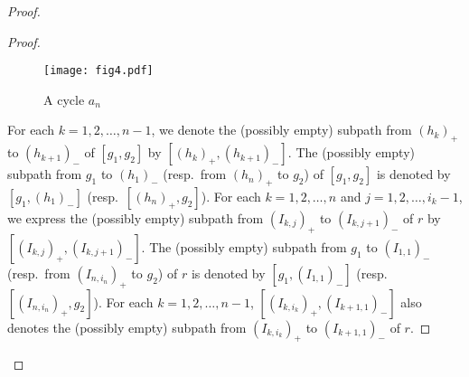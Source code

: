 \documentclass{amsart}
\theoremstyle{definition}
\begin{document}
\begin{proof}
\begin{proof}
\begin{figure}[top]
\begin{center}
\texttt{[image: fig4.pdf]}
\end{center}
\caption{A cycle $a_n$}
\label{fig4}
\end{figure}

For each $k=1,2,\ldots,n-1$, we denote the (possibly empty) subpath from $(h_k)_+$ to $(h_{k+1})_-$ of $[g_1,g_2]$ by $[(h_k)_+,(h_{k+1})_-]$. 
The (possibly empty) subpath from $g_1$ to $(h_1)_-$ (resp.\ from $(h_n)_+$ to $g_2$) of $[g_1,g_2]$ is denoted by $[g_1,(h_1)_-]$ (resp.\ $[(h_n)_+,g_2]$). 
For each $k=1,2,\ldots,n$ and $j=1,2,\ldots,i_k-1$, we express the (possibly empty) subpath from $(I_{k,j})_+$ to $(I_{k,j+1})_-$ of $r$ by $[(I_{k,j})_+,(I_{k,j+1})_-]$. 
The (possibly empty) subpath from $g_1$ to $(I_{1,1})_-$ (resp.\ from $(I_{n,i_n})_+$ to $g_2$) of $r$ is denoted by $[g_1,(I_{1,1})_-]$ (resp.\ $[(I_{n,i_n})_+,g_2]$). 
For each $k=1,2,\ldots,n-1$, $[(I_{k,i_k})_+,(I_{k+1,1})_-]$ also denotes the (possibly empty) subpath from $(I_{k,i_k})_+$ to $(I_{k+1,1})_-$ of $r$. 


\end{proof}
\end{proof}
\end{document}
